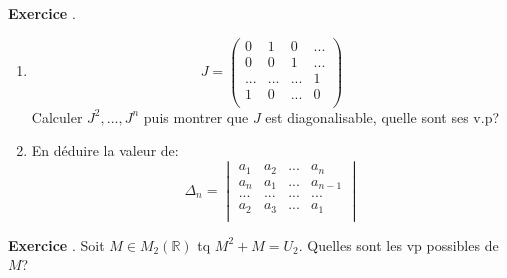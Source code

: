 \documentclass[10pt,a4paper]{article}
\newcounter{question}
\newcounter{exo}
\newenvironment{exo}{\vspace{0.5cm}\setcounter{question}{0}\addtocounter{exo}{1} \noindent \textbf{Exercice \theexo}. \normalsize }{\par}
\begin{document}
	\begin{exo}
		\begin{enumerate}
			\item $$J = \begin{pmatrix}
			0 & 1 & 0  & ... \\ 
			0 & 0 & 1 & ...\\ 
			... & ... & ...  & 1\\
			1 & 0 & ...  & 0\\
			\end{pmatrix}$$ Calculer $J^2, ..., J^n$ puis montrer que $J$ est diagonalisable, quelle sont ses v.p?
			\item En déduire la valeur de:
			$$\Delta_n = \begin{vmatrix}
			a_1 & a_2 & ... & a_n \\ 
			a_n & a_1 & ... & a_{n-1} \\ 
			... & ... & ... & ...\\
			a_2 & a_3 & ... & a_1\\
			\end{vmatrix}$$
		\end{enumerate}
	\end{exo}

	\begin{exo}
		Soit $M \in M_2(\mathbb{R})$ tq $M^2 + M = U_2$. Quelles sont les vp possibles de $M$?
	\end{exo}
		 
\end{document}
